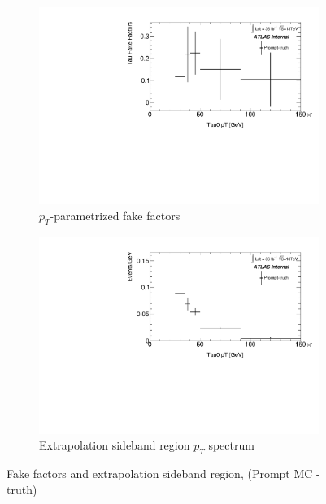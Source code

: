 \documentclass[11pt]{article}
\begin{document}
	\begin{figure}[H]
	\centering
	\begin{subfigure}{.5\textwidth}
	\centering
	\includegraphics[width=0.95\linewidth]{figures/FakesEstimate_data_pp8_nonallhad_new_scaledHists/FF_Faketau_Prompt-truth.pdf}
  	\caption{$p_T$-parametrized fake factors}
  	\label{fig:sub1}
	\end{subfigure}%
	\begin{subfigure}{.5\textwidth}
	\centering
	\includegraphics[width=0.95\linewidth]{figures/FakesEstimate_data_pp8_nonallhad_new_scaledHists/hist_Extrapolation_Prompt-truth.pdf}
	\caption{Extrapolation sideband region $p_T$ spectrum}
	\end{subfigure}
	\caption{Fake factors and extrapolation sideband region, (Prompt MC - truth)}
	\end{figure}
\end{document}
